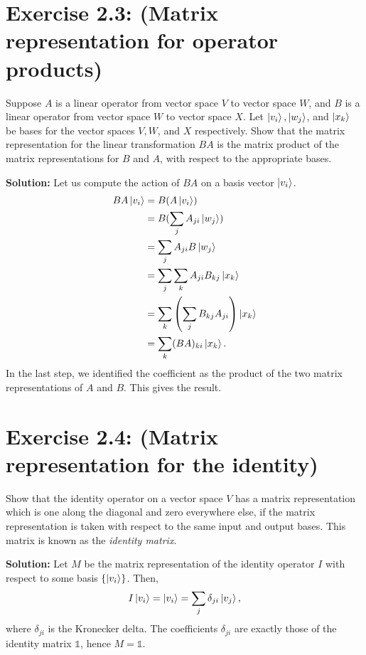 \documentclass{book}
\begin{document}
\section*{Exercise 2.3: (Matrix representation for operator products)}
    Suppose $A$ is a linear operator from vector space $V$ to vector space $W$, and $B$ is a linear operator from vector space $W$ to vector space $X$. Let $\ket{v_i}, \ket{w_j}$, and $\ket{x_k}$ be bases for the vector spaces $V, W$, and $X$ respectively. Show that the matrix representation for the linear transformation $BA$ is the matrix product of the matrix representations for $B$ and $A$, with respect to the appropriate bases.
    
    \textbf{Solution:} Let us compute the action of $BA$ on a basis vector $\ket{v_i}$.
    \begin{align}
    \begin{aligned}
        BA\ket{v_i} &= B(A\ket{v_i}) \\
        &= B(\sum_j A_{ji}\ket{w_j}) \\
        &= \sum_j A_{ji}B\ket{w_j} \\
        &= \sum_j\sum_k A_{ji}B_{kj}\ket{x_k} \\
        &= \sum_k \left(\sum_j B_{kj}A_{ji}\right) \ket{x_k} \\
        &= \sum_k (BA)_{ki} \ket{x_k}.
    \end{aligned}
    \end{align}
    In the last step, we identified the coefficient as the product of the two matrix representations of $A$ and $B$. This gives the result.
    
\section*{Exercise 2.4: (Matrix representation for the identity)}
    Show that the identity operator on a vector space $V$ has a matrix representation which is one along the diagonal and zero everywhere else, if the matrix representation is taken with respect to the same input and output bases. This matrix is known as the \emph{identity matrix}.
    
    \textbf{Solution:} Let $M$ be the matrix representation of the identity operator $I$ with respect to some basis $\left\{\ket{v_i}\right\}$. Then,
    \begin{align}
        I\ket{v_i} = \ket{v_i} = \sum_j \delta_{ji}\ket{v_j},
    \end{align}
    where $\delta_{ji}$ is the Kronecker delta. The coefficients $\delta_{ji}$ are exactly those of the identity matrix $\mathbb{1}$, hence $M = \mathbb{1}$.
    
\end{document}
